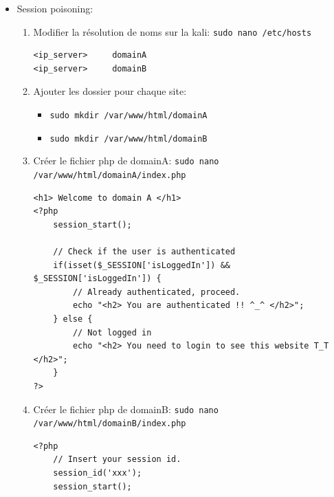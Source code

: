\documentclass[a4paper]{article}
\begin{document}
\begin{itemize}
\item Session poisoning:
\begin{example} \begin{enumerate}
    \item Modifier la résolution de noms sur la kali: \texttt{sudo nano /etc/hosts}
\begin{example} \begin{verbatim}
<ip_server>     domainA
<ip_server>     domainB
\end{verbatim} \end{example}
    \item Ajouter les dossier pour chaque site:
    \begin{itemize}
        \item \texttt{sudo mkdir /var/www/html/domainA}
        \item \texttt{sudo mkdir /var/www/html/domainB}
    \end{itemize}
    \item Créer le fichier php de domainA: \texttt{sudo nano /var/www/html/domainA/index.php}
\begin{lstlisting}[style=php]
<h1> Welcome to domain A </h1>
<?php
    session_start();

    // Check if the user is authenticated
    if(isset($_SESSION['isLoggedIn']) && $_SESSION['isLoggedIn']) {
        // Already authenticated, proceed.
        echo "<h2> You are authenticated !! ^_^ </h2>";
    } else {
        // Not logged in
        echo "<h2> You need to login to see this website T_T </h2>";
    }
?>
\end{lstlisting}
    \item Créer le fichier php de domainB: \texttt{sudo nano /var/www/html/domainB/index.php}
\begin{lstlisting}[style=php]
<?php
    // Insert your session id.
    session_id('xxx');
    session_start();


\end{lstlisting}
\end{enumerate}
\end{example}
\end{itemize}
\end{document}
